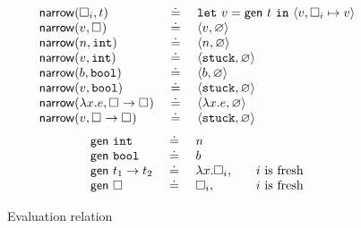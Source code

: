 \begin{figure}
$$
\begin{array}{lcl}
\mathsf{narrow}(\square_{i}, t) & \ \doteq\  & \mathtt{let}\ v = \mathsf{gen}\ t\ \mathtt{in}\ \langle v, \square_{i} \mapsto v \rangle \\
\mathsf{narrow}(v, \square_{})  & \ \doteq\  & \langle v, \varnothing \rangle \\
\mathsf{narrow}(n, \mathtt{int})    & \ \doteq\  & \langle n, \varnothing \rangle \\
\mathsf{narrow}(v, \mathtt{int})    & \ \doteq\  & \langle \mathtt{stuck}, \varnothing \rangle \\
\mathsf{narrow}(b, \mathtt{bool})   & \ \doteq\  & \langle b, \varnothing \rangle \\
\mathsf{narrow}(v, \mathtt{bool})   & \ \doteq\  & \langle \mathtt{stuck}, \varnothing \rangle \\
\mathsf{narrow}(\lambda x. e, {\square_{}} \rightarrow \square_{}) & \ \doteq\  & \langle \lambda x. e, \varnothing \rangle \\
\mathsf{narrow}(v, {\square_{}} \rightarrow \square_{}) & \ \doteq\  & \langle \mathtt{stuck}, \varnothing \rangle \\
\end{array}
$$
$$
\begin{array}{lcll}
\mathsf{gen}\ \mathtt{int}   & \ \doteq\  & n & \\
\mathsf{gen}\ \mathtt{bool}  & \ \doteq\  & b & \\
\mathsf{gen}\ {t_1} \rightarrow t_2 & \ \doteq\  & \lambda x. \square_{i}, & \quad \text{$i$ is fresh} \\
\mathsf{gen}\ \square_{} & \ \doteq\  & \square_{i}, & \quad \text{$i$ is fresh} \\
\end{array}
$$


\caption{Evaluation relation}
\label{fig:operational}
\end{figure}
